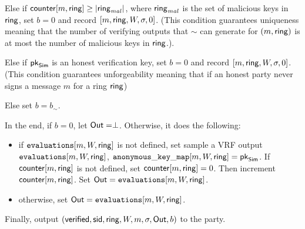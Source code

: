 \begin{tcolorbox}[colback=white]
{\begin{description}
\begin{list}{\hspace*{1pt} C}{}
		\item Else if $\mathsf{counter}[m, \mathsf{ring}] \geq |\mathsf{ring}_{\mathit{mal}}|$, where $\mathsf{ring}_{\mathit{mal}}$ is the set of malicious keys in $ \mathsf{ring} $, set $ b = 0 $ and record $ [m, \mathsf{ring},W,\sigma, 0] $.
		(This condition guarantees  uniqueness meaning that the number of verifying outputs that $ \sim $ can generate for $(m, \mathsf{ring})$ 
		is at most the  number of malicious keys in $ \mathsf{ring} $.)\label{cond:uniqueness}.
		
		\item Else if $ \mathsf{pk}_{\mathsf{Sim}} $ is an honest verification key, set $ b = 0 $ and record $ [m, \mathsf{ring},W,\sigma, 0] $. (This condition guarantees unforgeability meaning that if an honest party never signs a message $ m $ for a ring $ \mathsf{ring} $)\label{cond:forgery}
		\item Else set $ b = b_\sim$. \label{cond:simulatorbit}
	\end{list}
	In the end, if $ b = 0 $, let $ {\mathsf{Out}} = \perp $. Otherwise, it does the following:
	\begin{itemize}
		\item if $ \texttt{evaluations}[m,W,\mathsf{ring}] $ is not defined, set sample a VRF output $\texttt{evaluations}[m, W, \mathsf{ring}]$, $ \mathtt{anonymous\_key\_map}[m,W,\mathsf{ring}]  =  \mathsf{pk}_{\mathsf{Sim}}$. If $ \mathsf{counter}[m, \mathsf{ring}]  $ is not defined, set $ \mathsf{counter}[m, \mathsf{ring}]  = 0 $. Then increment $ \mathsf{counter}[m, \mathsf{ring}]  $. Set $ {\mathsf{Out}} = \texttt{evaluations}[m, W, \mathsf{ring}]$. 	
		\item otherwise, set $ {\mathsf{Out}} = \texttt{evaluations}[m, W, \mathsf{ring}]$. 	
	\end{itemize}
	Finally, output $(\mathsf{verified}, \textsf{sid}, \mathsf{ring},W, m, \sigma, {\mathsf{Out}}, b)$ to the party.
\end{description}

}
\end{tcolorbox}



